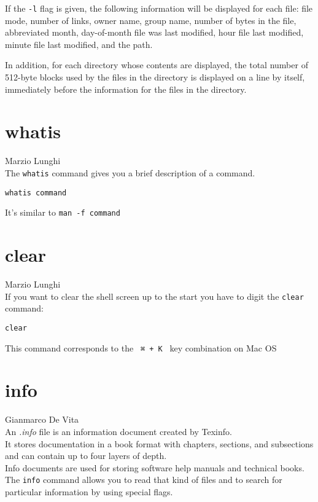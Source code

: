 \documentclass[hidelinks,12pt,a4paper,numbers=enddot]{scrartcl}
\begin{document}
If the \texttt{-l} flag is given, the following information will be displayed for
each file: file mode, number of links, owner name, group name, number of
bytes in the file, abbreviated month, day-of-month file was last modified,
hour file last modified, minute file last modified, and the path.

In addition, for each directory whose contents are displayed, the
total number of 512-byte blocks used by the files in the directory is
displayed on a line by itself, immediately before the information for the
files in the directory.

\section{whatis}


\large Marzio Lunghi \normalsize\\



The \texttt{whatis} command gives you a brief description of a command.

\begin{verbatim}
whatis command
\end{verbatim}

It's similar to \texttt{man -f command}

\section{clear}


\large Marzio Lunghi \normalsize\\


If you want to clear the shell screen up to the start you have to digit
the \texttt{clear} command:

\begin{verbatim}
clear
\end{verbatim}

This command corresponds to the \texttt{ ⌘ + K } key combination on Mac OS

\section{info}


\large Gianmarco De Vita \normalsize\\


An \emph{.info} file is an information document created by Texinfo.\\
It stores documentation in a book format with chapters, sections,
and subsections and can contain up to four layers of depth.\\
Info documents are used for storing software help manuals and technical books.\\
The \texttt{info} command allows you to read that kind of files
and to search for particular information by using special flags.
\end{document}
